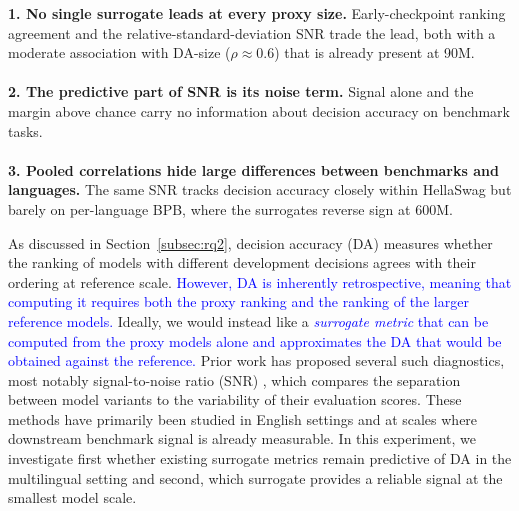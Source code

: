 \begin{rqfinding}
\textbf{1. No single surrogate leads at every proxy size.} Early-checkpoint ranking agreement and the relative-standard-deviation SNR trade the lead, both with a moderate association with DA-size ($\rho \approx 0.6$) that is already present at 90M.
\\
\\
\textbf{2. The predictive part of SNR is its noise term.} Signal alone and the margin above chance carry no information about decision accuracy on benchmark tasks.
\\
\\
\textbf{3. Pooled correlations hide large differences between benchmarks and languages.} The same SNR tracks decision accuracy closely within HellaSwag but barely on per-language BPB, where the surrogates reverse sign at 600M.
\end{rqfinding}


As discussed in Section~\ref{subsec:rq2}, decision accuracy (DA) measures whether the ranking of models with different development decisions agrees with their ordering at reference scale.
\textcolor{blue}{However, DA is inherently retrospective, meaning that computing it requires both the proxy ranking and the ranking of the larger reference models.}
Ideally, we would instead like a \textcolor{blue}{\textit{surrogate metric} that can be computed from the proxy models alone and approximates the DA that would be obtained against the reference.}
Prior work has proposed several such diagnostics, most notably signal-to-noise ratio (SNR) \citep{heineman_signal_2025}, which compares the separation between model variants to the variability of their evaluation scores.
These methods have primarily been studied in English settings and at scales where downstream benchmark signal is already measurable.
In this experiment, we investigate first whether existing surrogate metrics remain predictive of DA in the multilingual setting and second, which surrogate provides a reliable signal at the smallest model scale.

